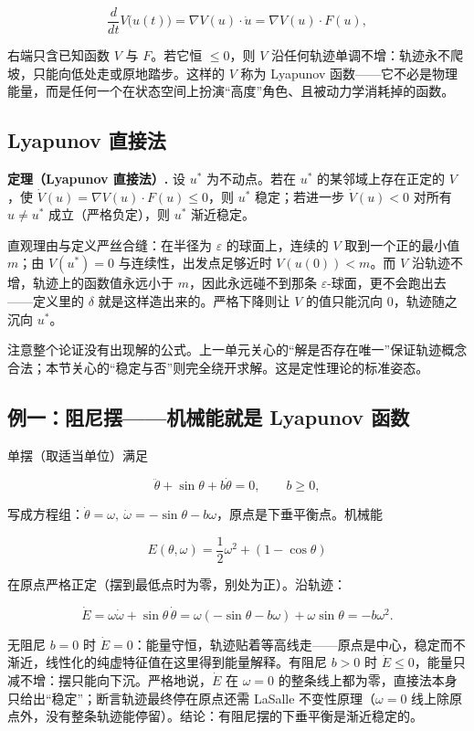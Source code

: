 \[
\frac{d}{dt}V\bigl(u(t)\bigr)
=\nabla V(u)\cdot\dot u
=\nabla V(u)\cdot F(u),
\]

右端只含已知函数 \(V\) 与 \(F\)。若它恒 \(\le0\)，则 \(V\) 沿任何轨迹单调不增：轨迹永不爬坡，只能向低处走或原地踏步。这样的 \(V\) 称为 Lyapunov 函数——它不必是物理能量，而是任何一个在状态空间上扮演``高度''角色、且被动力学消耗掉的函数。

\subsection{Lyapunov 直接法}

\textbf{定理（Lyapunov 直接法）.} 设 \(u^\ast\) 为不动点。若在 \(u^\ast\) 的某邻域上存在正定的 \(V\)，使 \(\dot V(u)=\nabla V(u)\cdot F(u)\le0\)，则 \(u^\ast\) 稳定；若进一步 \(\dot V(u)<0\) 对所有 \(u\ne u^\ast\) 成立（严格负定），则 \(u^\ast\) 渐近稳定。

直观理由与定义严丝合缝：在半径为 \(\varepsilon\) 的球面上，连续的 \(V\) 取到一个正的最小值 \(m\)；由 \(V(u^\ast)=0\) 与连续性，出发点足够近时 \(V(u(0))<m\)。而 \(V\) 沿轨迹不增，轨迹上的函数值永远小于 \(m\)，因此永远碰不到那条 \(\varepsilon\)-球面，更不会跑出去——定义里的 \(\delta\) 就是这样造出来的。严格下降则让 \(V\) 的值只能沉向 \(0\)，轨迹随之沉向 \(u^\ast\)。

注意整个论证没有出现解的公式。上一单元关心的``解是否存在唯一''保证轨迹概念合法；本节关心的``稳定与否''则完全绕开求解。这是定性理论的标准姿态。

\subsection{例一：阻尼摆——机械能就是 Lyapunov 函数}

单摆（取适当单位）满足

\[
\ddot\theta+\sin\theta+b\dot\theta=0,
\qquad b\ge0,
\]

写成方程组：\(\dot\theta=\omega,\ \dot\omega=-\sin\theta-b\omega\)，原点是下垂平衡点。机械能

\[
E(\theta,\omega)=\frac12\omega^2+(1-\cos\theta)
\]

在原点严格正定（摆到最低点时为零，别处为正）。沿轨迹：

\[
\dot E
=\omega\dot\omega+\sin\theta\,\dot\theta
=\omega(-\sin\theta-b\omega)+\omega\sin\theta
=-b\omega^2.
\]

无阻尼 \(b=0\) 时 \(\dot E=0\)：能量守恒，轨迹贴着等高线走——原点是中心，稳定而不渐近，线性化的纯虚特征值在这里得到能量解释。有阻尼 \(b>0\) 时 \(\dot E\le0\)，能量只减不增：摆只能向下沉。严格地说，\(\dot E\) 在 \(\omega=0\) 的整条线上都为零，直接法本身只给出``稳定''；断言轨迹最终停在原点还需 LaSalle 不变性原理（\(\omega=0\) 线上除原点外，没有整条轨迹能停留）。结论：有阻尼摆的下垂平衡是渐近稳定的。

